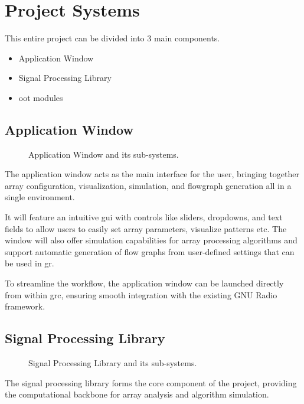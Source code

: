 \chapter{Project Systems} \label{ch: project-systems}

This entire project can be divided into 3 main components.

\begin{itemize}
	\item Application Window
	\item Signal Processing Library
	\item \ac{oot} modules
\end{itemize}

\section{Application Window}

\begin{figure}[h]
	\centering
	\caption{Application Window and its sub-systems.}
\end{figure}

The application window acts as the main interface for the user, bringing together array configuration, visualization, simulation, and flowgraph generation all in a single environment.

It will feature an intuitive \ac{gui} with controls like sliders, dropdowns, and text fields to allow users to easily set array parameters, visualize patterns etc. The window will also offer simulation capabilities for array processing algorithms and support automatic generation of flow graphs from user-defined settings that can be used in \acl{gr}.

To streamline the workflow, the application window can be launched directly from within \ac{grc}, ensuring smooth integration with the existing GNU Radio framework.

\section{Signal Processing Library}

\begin{figure}[h]
	\centering
	\caption{Signal Processing Library and its sub-systems.}
\end{figure}


The signal processing library forms the core component of the project, providing the computational backbone for array analysis and algorithm simulation.

